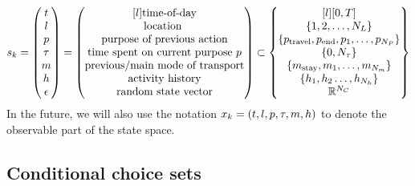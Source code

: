 \begin{equation}
    \s{k} = \begin{pmatrix}
    t \\
    l \\
    p \\
    \atime\\
    m \\
    \amem \\
    \epsilon
    \end{pmatrix} =
    \begin{pmatrix*}[l]
    \text{time-of-day} \\
    \text{location } \\
    \text{purpose of previous action} \\
    \text{time spent on current purpose $p$} \\
    \text{previous/main mode of transport} \\
    \text{activity history} \\
    \text{random state vector}
    \end{pmatrix*}
    \subset
    \begin{Bmatrix*}[l]
    [0,T] \\
    \{1,2,\dots, N_L\} \\
    \{p_{\text{travel}},p_{\text{end}},p_1,\dots,p_{N_P}\} \\
    \{0,N_{\atime}\} \\
    \{m_{\text{stay}},m_1,\dots,m_{N_m}\} \\
    \{\amem_1,\amem_2\dots,\amem_{N_\amem} \}\\
    \rr^{N_C}
    \end{Bmatrix*}
\end{equation}
In the future, we will also use the notation $x_k=(t,l,p,\tau,m,h)$ to denote the observable part of the state space.
\subsection{Conditional choice sets}


